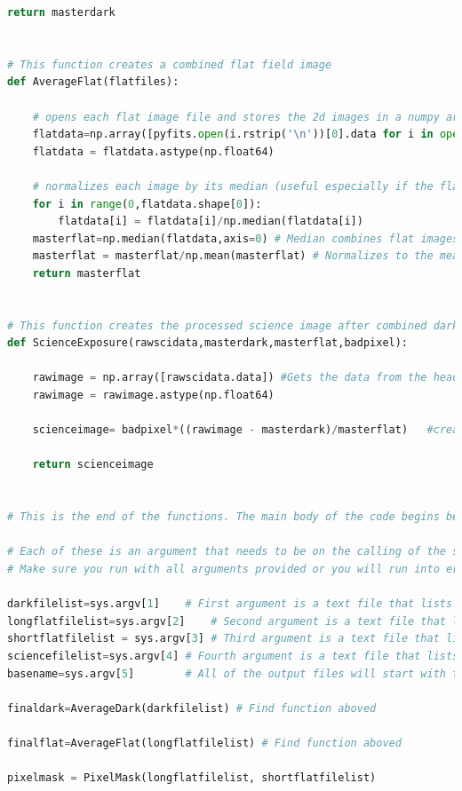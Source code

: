 \documentclass{aastex61}
\begin{document}
\begin{lstlisting}[language=Python, caption= Cleans science images (YM)]
	return masterdark


# This function creates a combined flat field image
def AverageFlat(flatfiles):

	# opens each flat image file and stores the 2d images in a numpy array
	flatdata=np.array([pyfits.open(i.rstrip('\n'))[0].data for i in open(flatfiles)])
	flatdata = flatdata.astype(np.float64)
	
	# normalizes each image by its median (useful especially if the flats have very different count level):
	for i in range(0,flatdata.shape[0]):
		flatdata[i] = flatdata[i]/np.median(flatdata[i])
	masterflat=np.median(flatdata,axis=0) # Median combines flat images
	masterflat = masterflat/np.mean(masterflat) # Normalizes to the mean of the flats
	return masterflat


# This function creates the processed science image after combined dark, and flat images have been created.  
def ScienceExposure(rawscidata,masterdark,masterflat,badpixel):

	rawimage = np.array([rawscidata.data]) #Gets the data from the header of the science image file
	rawimage = rawimage.astype(np.float64)
	
	scienceimage= badpixel*((rawimage - masterdark)/masterflat)   #creates final science image
	
	return scienceimage


# This is the end of the functions. The main body of the code begins below.

# Each of these is an argument that needs to be on the calling of the script. 
# Make sure you run with all arguments provided or you will run into errors!

darkfilelist=sys.argv[1]    # First argument is a text file that lists the names of all dark current image file names
longflatfilelist=sys.argv[2]    # Second argument is a text file that lists the names of all of the long exposure flat field images
shortflatfilelist = sys.argv[3] # Third argument is a text file that lists the names of all of the short exposure flat field images
sciencefilelist=sys.argv[4] # Fourth argument is a text file that lists the names of all the science images
basename=sys.argv[5]        # All of the output files will start with the string value of basename. 

finaldark=AverageDark(darkfilelist) # Find function aboved

finalflat=AverageFlat(longflatfilelist) # Find function aboved

pixelmask = PixelMask(longflatfilelist, shortflatfilelist)


\end{lstlisting}
\end{document}
